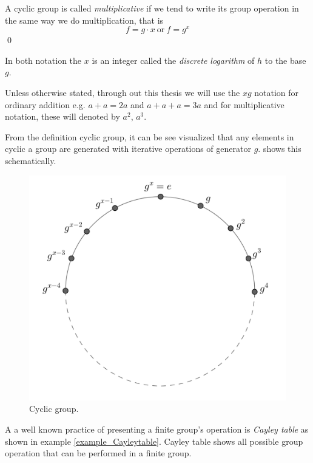 \begin{definition}
	A cyclic group is called \textit{multiplicative} if we tend to write its group operation in the same way we do multiplication, that is 
	$$f =  g \cdot x ~\text{or}~ f = g^x$$ 
	\qed
\end{definition}

\begin{remark}
	In both notation the $x$  is an integer called the \textit{discrete logarithm} of $h$ to the base $g$.
\end{remark}
\begin{remark}
	Unless otherwise stated, through out this thesis we will use the $xg$ notation for ordinary addition e.g. $a+a=2a$ and $a+a+a=3a$ and for multiplicative notation, these will denoted by $a^2$, $a^3$.
\end{remark}

From the definition cyclic group, it can be see visualized that any elements in cyclic a group are generated with iterative operations of generator $g$. 
 shows this schematically.
\begin{figure}[ht]
\begin{center}
	\includegraphics[width=.6\linewidth, height=.67\textheight, keepaspectratio]{Figures/cyclicgroup}
\caption{Cyclic group.}
\label{Cyclic group}
\end{center}
\end{figure}

A a well known practice of presenting a finite group's operation is {\em Cayley table} as shown in example \ref{example_Cayleytable}.
Cayley table shows all possible group operation that can be performed in a finite group.

